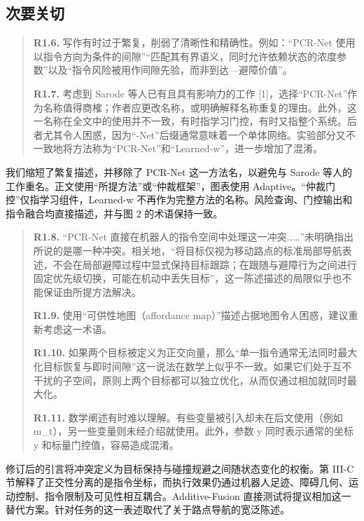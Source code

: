 \subsection*{次要关切}
\begin{quote}
\textbf{R1.6.} 写作有时过于繁复，削弱了清晰性和精确性。例如：“PCR-Net 使用以指令方向为条件的间隙”“匹配其有界语义，同时允许依赖状态的浓度参数”以及“指令风险被用作间隙先验，而非到达—避障价值”。

\textbf{R1.7.} 考虑到 Sarode 等人已有且具有影响力的工作 [1]，选择“PCR-Net”作为名称值得商榷；作者应更改名称，或明确解释名称重复的理由。此外，这一名称在全文中的使用并不一致，有时指学习门控，有时又指整个系统。后者尤其令人困惑，因为“-Net”后缀通常意味着一个单体网络。实验部分又不一致地将方法称为“PCR-Net”和“Learned-w”，进一步增加了混淆。
\end{quote}
\response
我们缩短了繁复描述，并移除了 PCR-Net 这一方法名，以避免与 Sarode 等人的工作重名。正文使用“所提方法”或“仲裁框架”，图表使用 Adaptive。“仲裁门控”仅指学习组件，Learned-w 不再作为完整方法的名称。风险查询、门控输出和指令融合均直接描述，并与图 2 的术语保持一致。

\begin{quote}
\textbf{R1.8.} “PCR-Net 直接在机器人的指令空间中处理这一冲突……”未明确指出所说的是哪一种冲突。相关地，“将目标仅视为移动路点的标准局部导航表述，不会在局部避障过程中显式保持目标跟踪；在跟随与避障行为之间进行固定优先级切换，可能在机动中丢失目标”，这一陈述描述的局限似乎也不能保证由所提方法解决。

\textbf{R1.9.} 使用“可供性地图（affordance map）”描述占据地图令人困惑，建议重新考虑这一术语。

\textbf{R1.10.} 如果两个目标被定义为正交向量，那么“单一指令通常无法同时最大化目标恢复与即时间隙”这一说法在数学上似乎不一致。如果它们处于互不干扰的子空间，原则上两个目标都可以独立优化，从而仅通过相加就同时最大化。

\textbf{R1.11.} 数学阐述有时难以理解。有些变量被引入却未在后文使用（例如 m\_t），另一些变量则未经介绍就使用。此外，参数 y 同时表示通常的坐标 y 和标量门控值，容易造成混淆。
\end{quote}
\response
修订后的引言将冲突定义为目标保持与碰撞规避之间随状态变化的权衡。第 III-C 节解释了正交性分离的是指令坐标，而执行效果仍通过机器人足迹、障碍几何、运动控制、指令限制及可见性相互耦合。Additive-Fusion 直接测试将提议相加这一替代方案。针对任务的这一表述取代了关于路点导航的宽泛陈述。

